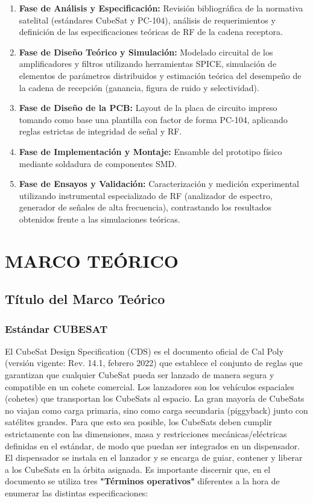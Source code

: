 \documentclass[11pt,a4paper,twoside]{report}
\begin{document}
	\begin{enumerate}
		\item \textbf{Fase de Análisis y Especificación:} Revisión bibliográfica de la normativa satelital (estándares CubeSat y PC-104), análisis de requerimientos y definición de las especificaciones teóricas de RF de la cadena receptora.
		
		\item \textbf{Fase de Diseño Teórico y Simulación:} Modelado circuital de los amplificadores y filtros utilizando herramientas SPICE, simulación de elementos de parámetros distribuidos y estimación teórica del desempeño de la cadena de recepción (ganancia, figura de ruido y selectividad).
		
		\item \textbf{Fase de Diseño de la PCB:} Layout de la placa de circuito impreso tomando como base una plantilla con factor de forma PC-104, aplicando reglas estrictas de integridad de señal y RF.
		
		\item \textbf{Fase de Implementación y Montaje:} Ensamble del prototipo físico mediante soldadura de componentes SMD.
		
		\item \textbf{Fase de Ensayos y Validación:} Caracterización y medición experimental utilizando instrumental especializado de RF (analizador de espectro, generador de señales de alta frecuencia), contrastando los resultados obtenidos frente a las simulaciones teóricas.
	\end{enumerate}\newpage
	
	\part{MARCO TEÓRICO}
	\chapter{Título del Marco Teórico}
	\section{Estándar CUBESAT}
	El CubeSat Design Specification (CDS) es el documento oficial de Cal Poly (versión vigente: Rev. 14.1, febrero 2022) que establece el conjunto de reglas que garantizan que cualquier CubeSat pueda ser lanzado de manera segura y compatible en un cohete comercial.
	Los lanzadores son los vehículos espaciales (cohetes) que transportan los CubeSats al espacio. La gran mayoría de CubeSats no viajan como carga primaria, sino como carga secundaria (piggyback) junto con satélites grandes.
	Para que esto sea posible, los CubeSats deben cumplir estrictamente con las dimensiones, masa y restricciones mecánicas/eléctricas definidas en el estándar, de modo que puedan ser integrados en un dispensador. El dispensador se instala en el lanzador y se encarga de guiar, contener y liberar a los CubeSats en la órbita asignada. Es importante discernir que, en el documento se utiliza tres \textbf{"Términos operativos"} diferentes a la hora de enumerar las distintas especificaciones:
	
\end{document}
